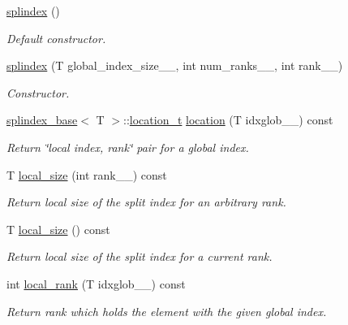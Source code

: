 \begin{DoxyCompactItemize}
\item 
\hyperlink{classsddk_1_1splindex_3_01block_00_01_t_01_4_a6860e56ea0f7def61f916208f2a8f70c}{splindex} ()
\begin{DoxyCompactList}\small\item\em Default constructor. \end{DoxyCompactList}\item 
\hyperlink{classsddk_1_1splindex_3_01block_00_01_t_01_4_a12a4616482a165b143f574b823f2246b}{splindex} (T global\+\_\+index\+\_\+size\+\_\+\+\_\+, int num\+\_\+ranks\+\_\+\+\_\+, int rank\+\_\+\+\_\+)
\begin{DoxyCompactList}\small\item\em Constructor. \end{DoxyCompactList}\item 
\hyperlink{classsddk_1_1splindex__base}{splindex\+\_\+base}$<$ T $>$\+::\hyperlink{structsddk_1_1splindex__base_1_1location__t}{location\+\_\+t} \hyperlink{classsddk_1_1splindex_3_01block_00_01_t_01_4_aba052380e2f9a35eee699d6f7675e0d2}{location} (T idxglob\+\_\+\+\_\+) const 
\begin{DoxyCompactList}\small\item\em Return \char`\"{}local index, rank\char`\"{} pair for a global index. \end{DoxyCompactList}\item 
T \hyperlink{classsddk_1_1splindex_3_01block_00_01_t_01_4_aa856dbc9c4feaa69cb9755cfd72cb7c7}{local\+\_\+size} (int rank\+\_\+\+\_\+) const 
\begin{DoxyCompactList}\small\item\em Return local size of the split index for an arbitrary rank. \end{DoxyCompactList}\item 
T \hyperlink{classsddk_1_1splindex_3_01block_00_01_t_01_4_a42ef3c91fb758e8881012c27fb2aa180}{local\+\_\+size} () const 
\begin{DoxyCompactList}\small\item\em Return local size of the split index for a current rank. \end{DoxyCompactList}\item 
int \hyperlink{classsddk_1_1splindex_3_01block_00_01_t_01_4_adf858471a157c0414554771da315a14c}{local\+\_\+rank} (T idxglob\+\_\+\+\_\+) const 
\begin{DoxyCompactList}\small\item\em Return rank which holds the element with the given global index. \end{DoxyCompactList}\item 

\end{DoxyCompactItemize}
